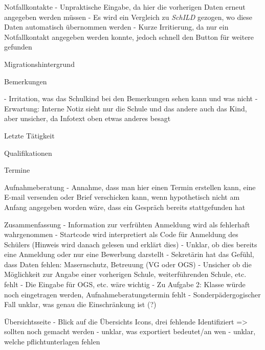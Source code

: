 Notfallkontakte
- Unpraktische Eingabe, da hier die vorherigen Daten erneut angegeben werden müssen 
 - Es wird ein Vergleich zu \textit{SchILD} gezogen, wo diese Daten automatisch übernommen werden
- Kurze Irritierung, da nur ein Notfallkontakt angegeben werden konnte, jedoch schnell den Button für weitere gefunden
	















Migrationshintergrund		










Bemerkungen

- Irritation, was das Schulkind bei den Bemerkungen sehen kann und was nicht
- Erwartung: Interne Notiz sieht nur die Schule und das andere auch das Kind, aber unsicher, da Infotext oben etwas anderes besagt


Letzte Tätigkeit		

Qualifikationen		

Termine		

Aufnahmeberatung
- Annahme, dass man hier einen Termin erstellen kann, eine E-mail versenden oder Brief verschicken kann, wenn hypothetisch nicht am Anfang angegeben worden wäre, dass ein Gespräch bereits stattgefunden hat	

Zusammenfassung
- Information zur verfrühten Anmeldung wird als fehlerhaft wahrgenommen
- Startcode wird interpretiert als Code für Anmeldung des Schülers (Hinweis wird danach gelesen und erklärt dies)
- Unklar, ob dies bereits eine Anmeldung oder nur eine Bewerbung darstellt	
- Sekretärin hat das Gefühl, dass Daten fehlen: Masernschutz, Betreuung (VG oder OGS)
- Unsicher ob die Möglichkeit zur Angabe einer vorherigen Schule, weiterführenden Schule, etc. fehlt
- Die Eingabe für OGS, etc. wäre wichtig
- Zu Aufgabe 2: Klasse würde noch eingetragen werden, Aufnahmeberatungstermin fehlt
- Sonderpädergogischer Fall unklar, was genau die Einschränkung ist (?)

Übersichtsseite
- Blick auf die Übersichts Icons, drei fehlende Identifiziert => sollten noch gemacht werden
- unklar, was exportiert bedeutet/an wen
- unklar, welche pflichtunterlagen fehlen






